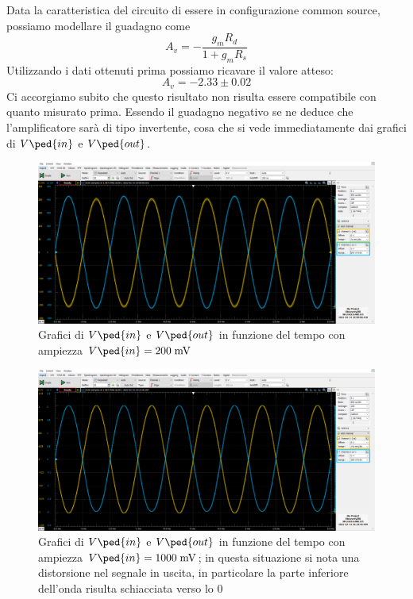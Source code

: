 \documentclass[10pt, a4paper, italian]{article}
\begin{document}
Data la caratteristica del circuito di essere in configurazione common source, possiamo modellare il guadagno come
\begin{equation}
A_v = -\frac{g_m R_d}{1+g_mR_s}
\end{equation}
Utilizzando i dati ottenuti prima possiamo ricavare il valore atteso:
\[
A_v = -2.33 \pm 0.02
\]
Ci accorgiamo subito che questo risultato non risulta essere compatibile con quanto misurato prima.
Essendo il guadagno negativo se ne deduce che l'amplificatore sarà di tipo invertente, cosa che si vede immediatamente dai grafici di $V\ped{in}$ e $V\ped{out}$.
\begin{figure}[htbp]
    \centering
	\includegraphics[scale=0.4]{amp.200}
    \caption{Grafici di $V\ped{in}$ e $V\ped{out}$ in funzione del tempo con ampiezza $V\ped{in}=200 \; \si{m\V}$}
\end{figure}
\begin{figure}[htbp]
    \centering
	\includegraphics[scale=0.4]{amp.1000}
    \caption{Grafici di $V\ped{in}$ e $V\ped{out}$ in funzione del tempo con ampiezza $V\ped{in}=1000 \; \si{m\V}$; in questa situazione si nota una distorsione nel segnale in uscita, in particolare la parte inferiore dell'onda risulta schiacciata verso lo 0}
\end{figure}
\end{document}
